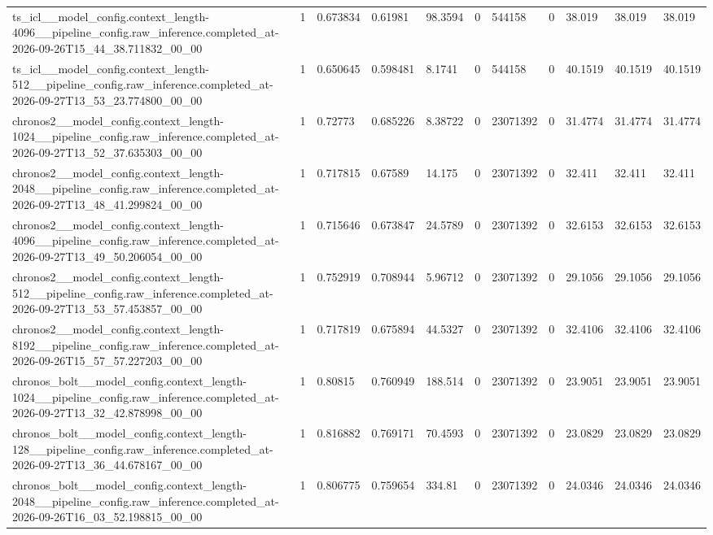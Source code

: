 \begin{tabular}{lllllllllll}
ts\_icl\_\_model\_config.context\_length-4096\_\_pipeline\_config.raw\_inference.completed\_at-2026-09-26T15\_44\_38.711832\_00\_00 & 1 & 0.673834 & 0.61981 & 98.3594 & 0 & 544158 & 0 & 38.019 & 38.019 & 38.019 \\
ts\_icl\_\_model\_config.context\_length-512\_\_pipeline\_config.raw\_inference.completed\_at-2026-09-27T13\_53\_23.774800\_00\_00 & 1 & 0.650645 & 0.598481 & 8.1741 & 0 & 544158 & 0 & 40.1519 & 40.1519 & 40.1519 \\
chronos2\_\_model\_config.context\_length-1024\_\_pipeline\_config.raw\_inference.completed\_at-2026-09-27T13\_52\_37.635303\_00\_00 & 1 & 0.72773 & 0.685226 & 8.38722 & 0 & 23071392 & 0 & 31.4774 & 31.4774 & 31.4774 \\
chronos2\_\_model\_config.context\_length-2048\_\_pipeline\_config.raw\_inference.completed\_at-2026-09-27T13\_48\_41.299824\_00\_00 & 1 & 0.717815 & 0.67589 & 14.175 & 0 & 23071392 & 0 & 32.411 & 32.411 & 32.411 \\
chronos2\_\_model\_config.context\_length-4096\_\_pipeline\_config.raw\_inference.completed\_at-2026-09-27T13\_49\_50.206054\_00\_00 & 1 & 0.715646 & 0.673847 & 24.5789 & 0 & 23071392 & 0 & 32.6153 & 32.6153 & 32.6153 \\
chronos2\_\_model\_config.context\_length-512\_\_pipeline\_config.raw\_inference.completed\_at-2026-09-27T13\_53\_57.453857\_00\_00 & 1 & 0.752919 & 0.708944 & 5.96712 & 0 & 23071392 & 0 & 29.1056 & 29.1056 & 29.1056 \\
chronos2\_\_model\_config.context\_length-8192\_\_pipeline\_config.raw\_inference.completed\_at-2026-09-26T15\_57\_57.227203\_00\_00 & 1 & 0.717819 & 0.675894 & 44.5327 & 0 & 23071392 & 0 & 32.4106 & 32.4106 & 32.4106 \\
chronos\_bolt\_\_model\_config.context\_length-1024\_\_pipeline\_config.raw\_inference.completed\_at-2026-09-27T13\_32\_42.878998\_00\_00 & 1 & 0.80815 & 0.760949 & 188.514 & 0 & 23071392 & 0 & 23.9051 & 23.9051 & 23.9051 \\
chronos\_bolt\_\_model\_config.context\_length-128\_\_pipeline\_config.raw\_inference.completed\_at-2026-09-27T13\_36\_44.678167\_00\_00 & 1 & 0.816882 & 0.769171 & 70.4593 & 0 & 23071392 & 0 & 23.0829 & 23.0829 & 23.0829 \\
chronos\_bolt\_\_model\_config.context\_length-2048\_\_pipeline\_config.raw\_inference.completed\_at-2026-09-26T16\_03\_52.198815\_00\_00 & 1 & 0.806775 & 0.759654 & 334.81 & 0 & 23071392 & 0 & 24.0346 & 24.0346 & 24.0346 \\

\end{tabular}
